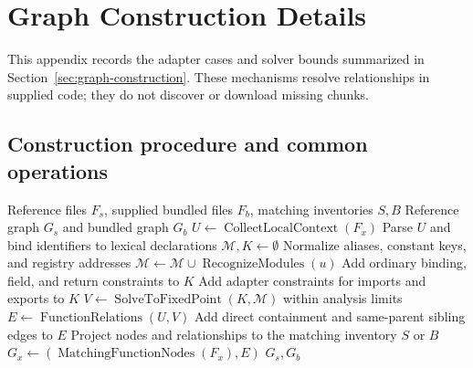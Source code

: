 \section{Graph Construction Details}
\label{sec:graph-details}
This appendix records the adapter cases and solver bounds summarized in Section~\ref{sec:graph-construction}. These mechanisms resolve relationships in supplied code; they do not discover or download missing chunks.

\subsection{Construction procedure and common operations}
\begin{algorithm}[htbp]
\caption{Constructing graphs for neighborhood search}
\label{alg:graphs}
\begin{algorithmic}[1]
\Require Reference files $F_s$, supplied bundled files $F_b$, matching inventories $S,B$
\Ensure Reference graph $G_s$ and bundled graph $G_b$
  \State $U\gets\operatorname{CollectLocalContext}(F_x)$
  \State Parse $U$ and bind identifiers to lexical declarations
  \State $\mathcal{M},K\gets\emptyset$ 
    \State Normalize aliases, constant keys, and registry addresses
    \State $\mathcal{M}\gets\mathcal{M}\cup\operatorname{RecognizeModules}(u)$
    \State Add ordinary binding, field, and return constraints to $K$
    \State Add adapter constraints for imports and exports to $K$
  \EndFor
  \State $V\gets\operatorname{SolveToFixedPoint}(K,\mathcal{M})$ within analysis limits
  \State $E\gets\operatorname{FunctionRelations}(U,V)$
  \State Add direct containment and same-parent sibling edges to $E$
  \State Project nodes and relationships to the matching inventory $S$ or $B$
  \State $G_x\gets(\operatorname{MatchingFunctionNodes}(F_x),E)$
\EndFor
\State \Return $G_s,G_b$
\end{algorithmic}
\end{algorithm}

